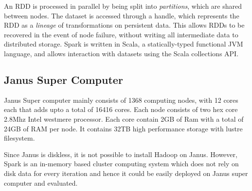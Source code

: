 \documentclass{article}
\begin{document}
An RDD is processed in parallel by being split into \emph{partitions}, which
are shared between nodes. The dataset is accessed through a handle, which
represents the RDD as a \emph{lineage} of transformations on persistent data.
This allows RDDs to be recovered in the event of node failure, without writing
all intermediate data to distributed storage. Spark is written in Scala,
a statically-typed functional JVM language, and allows interaction with datasets
using the Scala collections API.


\subsection*{Janus Super Computer}
Janus Super computer mainly consists of 1368 computing nodes, with  12 cores each that adds upto a total of 16416 cores. Each node consists of two hex core 2.8Mhz Intel westmere processor. Each core contain 2GB of Ram with a total of 24GB of RAM per node. It  contains 32TB high performance storage with lustre filesystem. 

Since Janus is diskless, it is not possible to install Hadoop on Janus. However, Spark is an in-memory based cluster computing system which does not rely on disk data for every iteration and hence it could be easily deployed on Janus super computer and evaluated.


\end{document}
